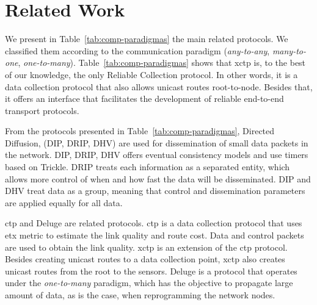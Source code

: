 \section{Related Work}
\label{sec:related-work}






We present in Table~\ref{tab:comp-paradigmas} the main related
protocols. We classified them according to the communication
paradigm (\textit{any-to-any}, \textit{many-to-one},
\textit{one-to-many}). Table~\ref{tab:comp-paradigmas} shows that
\ac{xctp} is, to the best of our knowledge, the only Reliable
Collection protocol. In other words, it is a data collection
protocol that also allows unicast routes root-to-node. Besides that,
it offers an interface that facilitates the development of reliable
end-to-end transport protocols.

From the protocols presented in Table~\ref{tab:comp-paradigmas},
Directed Diffusion\cite{directedDiffusion}, (DIP, DRIP,
DHV)\cite{tinyos} are used for dissemination of small data packets
in the network. DIP, DRIP, DHV offers eventual consistency models
and use timers based on Trickle\cite{trickle}. DRIP treats each
information as a separated entity, which allows more control of when
and how fast the data will be disseminated. DIP and DHV treat data
as a group, meaning that control and dissemination parameters are
applied equally for all data.


\ac{ctp} and Deluge are related protocols. \ac{ctp} is a data
collection protocol that uses \ac{etx} metric to estimate the link
quality and route cost. Data and control packets are used to obtain
the link quality. \ac{xctp} is an extension of the \ac{ctp}
protocol. Besides creating unicast routes to a data collection
point, \ac{xctp} also creates unicast routes from the root to the
sensors. Deluge is a protocol that operates under the
\textit{one-to-many} paradigm, which has the objective to propagate
large amount of data, as is the case, when reprogramming the network
nodes.


